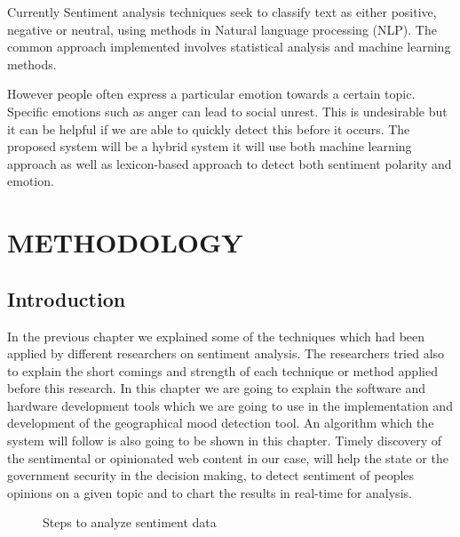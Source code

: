 Currently Sentiment analysis techniques seek to classify text as either positive, negative or neutral, using methods in Natural language processing (NLP). The common approach implemented involves statistical analysis and machine learning methods.\cite{ref2}

%
However people often express a particular emotion towards a certain topic. Specific emotions such as anger can lead to social unrest. This is undesirable but it can be helpful if we are able to quickly detect this before it occurs.
%
The proposed system will be a hybrid system it will use both machine learning approach as well as lexicon-based approach to detect both sentiment polarity and emotion.


\clearpage


\section{METHODOLOGY}
\subsection{Introduction}
In the previous chapter we explained some of the techniques which had been applied by different
researchers on sentiment analysis. The researchers tried also to explain the short comings and
strength of each technique or method applied before this research. In this chapter we are going to
explain the software and hardware development tools which we are going to use in the
implementation and development of the geographical mood detection tool. An algorithm which
the system will follow is also going to be shown in this chapter. Timely discovery of the
sentimental or opinionated web content in our case, will help the state or the government security
in the decision making, to detect sentiment of people\textquotesingle s opinions on a given topic and  to chart the results in real-time for analysis.


\begin{figure}[h]
  \centering
  \caption[Example figure]%
  {Steps to analyze sentiment data}
  \label{fig:ALAP:sm1}
\end{figure}




